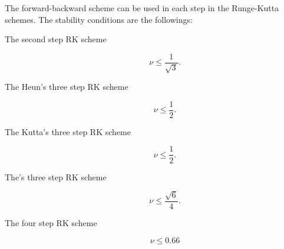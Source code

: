 The forward-backward scheme can be used in each step in the Runge-Kutta schemes.
The stability conditions are the followings:
\begin{description}
 \item[The second step RK scheme]
 \begin{equation}
   \nu \le \frac{1}{\sqrt{3}}.
 \end{equation}

 \item[The Heun's three step RK scheme]
 \begin{equation}
   \nu \le \frac{1}{2}.
 \end{equation}

 \item[The Kutta's three step RK scheme]
 \begin{equation}
   \nu \le \frac{1}{2}.
 \end{equation}

 \item[The\citet{Wicker_Skamarock_2002}'s three step RK scheme]
 \begin{equation}
   \nu \le \frac{\sqrt{6}}{4}.
 \end{equation}

 \item[The four step RK scheme]
 \begin{equation}
   \nu \le 0.66
 \end{equation}


\end{description}
